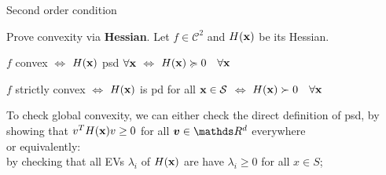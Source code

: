 \documentclass[11pt,compress,t,notes=noshow, xcolor=table]{beamer}
\begin{document}
\begin{vbframe}{Second order condition}





Prove convexity via \textbf{Hessian}. 
Let $f \in \mathcal{C}^2$ and $H(\mathbf{x})$ be its Hessian.

\lz

$f$ convex $\Longleftrightarrow$ 
$H(\mathbf{x})$ psd $\forall \mathbf{x}$ $\Longleftrightarrow$ 
$H(\mathbf{x}) \succcurlyeq 0 \quad \forall \mathbf{x}$

\lz

$f$ strictly convex $\Longleftrightarrow$ 
$H(\mathbf{x})$ is pd for all $\mathbf{x} \in \mathcal{S}$ $\Longleftrightarrow$ 
$H(\mathbf{x}) \succ 0 \quad \forall \mathbf{x}$





\lz \lz

To check global convexity, we can either check the direct definition of psd, by showing that $v^T H(\mathbf{x}) v \geq 0$ for all $\bm{v} \in \R^d$ everywhere\\
or equivalently: \\
by checking that all EVs $\lambda_i$ of $H(\mathbf{x})$ are have $\lambda_i \geq 0$  for all $x \in S$; 

\framebreak




\end{vbframe}
\end{document}
